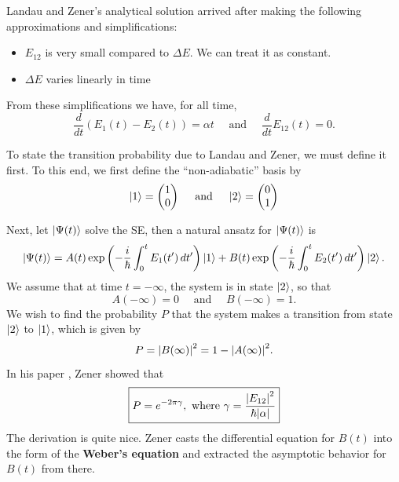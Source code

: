 \documentclass{book}
\theoremstyle{definition}
\newcommand{\al}{\alpha}
\newcommand{\f}[2]{\frac{#1}{#2}}
\newcommand{\lp}{\left(}
\newcommand{\rp}{\right)}
\begin{document}
Landau and Zener's analytical solution arrived after making the following approximations and simplifications: 
\begin{itemize}
	\item $E_{12}$ is very small compared to $\Delta E$. We can treat it as constant.
	\item $\Delta E$ varies linearly in time 
\end{itemize}

From these simplifications we have, for all time, 
\begin{equation*}
\f{d}{dt}(E_1(t) - E_2(t)) = \al t \quad \text{ and } \quad \f{d}{dt}{E_{12}(t)} = 0.
\end{equation*}

To state the transition probability due to Landau and Zener, we must define it first. To this end, we first define the ``non-adiabatic'' basis by 
\begin{equation*}
\ket{1} = \begin{pmatrix}
1 \\ 0
\end{pmatrix} \quad \text{ and }  \quad
\ket{2} = \begin{pmatrix}
0 \\ 1
\end{pmatrix}
\end{equation*}

Next, let $\ket{\Psi(t)}$ solve the SE, then a natural ansatz for $\ket{\Psi(t)}$ is 
\begin{equation*}
\ket{\Psi(t)} = A(t) \exp \lp -\f{i}{\hbar}\int_0^{t} E_1(t')\,dt' \rp \ket{1} + B(t) \exp \lp -\f{i}{\hbar}\int_0^{t} E_2(t')\,dt' \rp \ket{2}.
\end{equation*}
We assume that at time $t=-\infty$, the system is in state $\ket{2}$, so that
\begin{equation*}
A(-\infty) = 0 \quad \text{ and } \quad B(-\infty) = 1.
\end{equation*}
We wish to find the probability $P$ that the system makes a transition from state $\ket{2}$ to $\ket{1}$, which is given by 
\begin{equation*}
P = \abs{B(\infty)}^2 = 1- \abs{A(\infty)}^2.
\end{equation*}
In his paper \cite{zener1932non}, Zener showed that 
\begin{equation*}
\boxed{P = e^{-2\pi \gamma}, \text{ where } \gamma = \f{\abs{E_{12}}^2}{\hbar \abs{\al}}} 
\end{equation*}
The derivation is quite nice. Zener casts the differential equation for $B(t)$ into the form of the \textbf{Weber's equation} and extracted the asymptotic behavior for $B(t)$ from there. 
\end{document}
